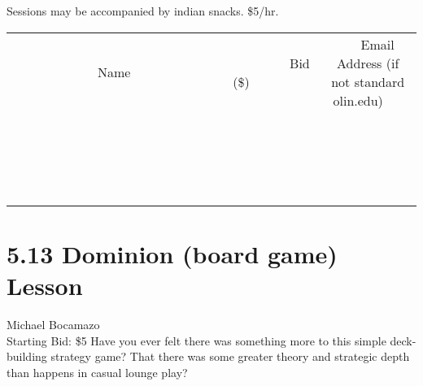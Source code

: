 \documentclass[11pt]{article}
\begin{document}
Sessions may be accompanied by indian snacks. \$5/hr.
\\[3ex]
\begin{tabular}{c c c}
~~~~~~~~~~~~~Name~~~~~~~~~~~~~ & ~~~~~~~~~Bid (\$)~~~~~~~~~  & ~~~Email Address (if not standard olin.edu)~~~\\
 & & \\
\hline
 & & \\
\hline
 & & \\
\hline
 & & \\
\hline
 & & \\
\hline
 & & \\
\hline
 & & \\
\hline
 & & \\
\hline
 & & \\
\hline
 & & \\
\hline
 & & \\
\hline
 & & \\
\hline
 & & \\
\hline
 & & \\
\hline
 & & \\
\hline
 & & \\
\hline
 & & \\
\hline
 & & \\
\hline
 & & \\
\hline
\end{tabular}
\newpage
\section*{5.13 Dominion (board game) Lesson}
Michael Bocamazo
\\
Starting Bid: \$5
\newline
Have you ever felt there was something more to this simple deck-building strategy game?  That there was some greater theory and strategic depth than happens in casual lounge play?  
\end{document}
